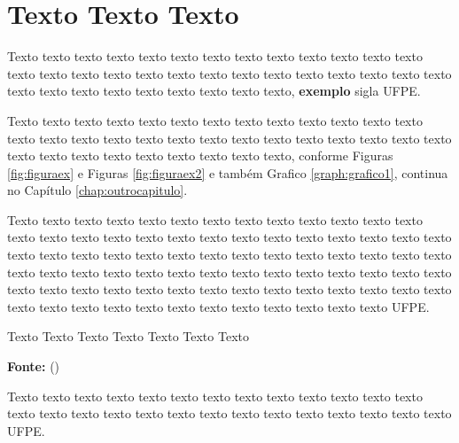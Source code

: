 \section{Texto Texto Texto}
\label{motivacao}

Texto texto texto texto texto texto texto texto texto texto texto texto texto texto texto texto texto texto texto texto texto texto texto texto texto texto texto texto texto texto texto texto texto texto texto texto, \textbf{exemplo} sigla \gls{UFPE}.



Texto texto texto texto texto texto texto texto texto texto texto texto texto texto texto texto texto texto texto texto texto texto texto texto texto texto texto texto texto texto texto texto texto texto texto texto, conforme Figuras \ref{fig:figuraex} e Figuras \ref{fig:figuraex2} e também Grafico \ref{graph:grafico1}, continua no Capítulo \ref{chap:outrocapitulo}.




Texto texto texto texto texto texto texto texto texto texto texto texto texto texto texto texto texto texto texto texto texto texto texto texto texto texto texto texto texto texto texto texto texto texto texto texto texto texto texto texto texto texto texto texto texto texto texto texto texto texto texto texto texto texto texto texto texto texto texto texto texto texto texto texto texto texto texto texto texto texto texto texto texto texto texto texto texto texto texto texto texto \gls{UFPE}.

\begin{grafico}[ht!]
\centering

\caption{\textmd{Texto Texto Texto Texto Texto Texto Texto}}
\label{graph:grafico1}

\par\medskip\ABNTEXfontereduzida\selectfont\textbf{Fonte:} \citeauthor{manualufpe2020} (\citeyear{manualufpe2020}) \par\medskip
\end{grafico}

Texto texto texto texto texto texto texto texto texto texto texto texto texto texto texto texto texto texto texto texto texto texto texto texto texto texto texto \gls{UFPE}.
